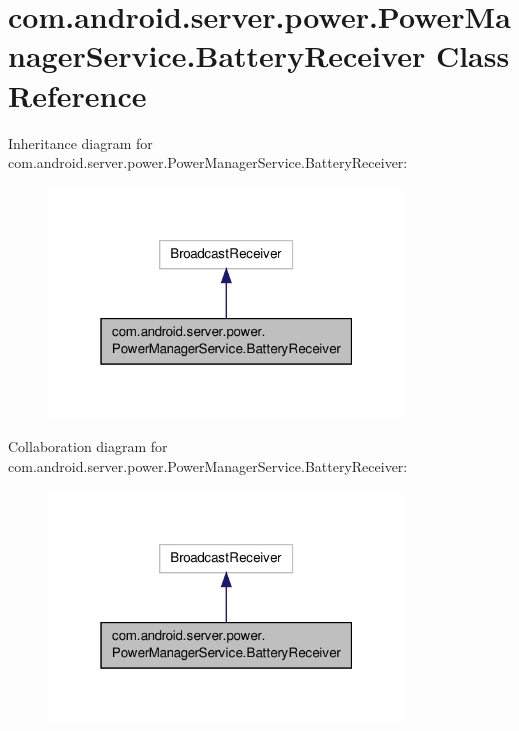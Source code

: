 \hypertarget{classcom_1_1android_1_1server_1_1power_1_1PowerManagerService_1_1BatteryReceiver}{\section{com.\-android.\-server.\-power.\-Power\-Manager\-Service.\-Battery\-Receiver Class Reference}
\label{classcom_1_1android_1_1server_1_1power_1_1PowerManagerService_1_1BatteryReceiver}
}


Inheritance diagram for com.\-android.\-server.\-power.\-Power\-Manager\-Service.\-Battery\-Receiver\-:
\nopagebreak
\begin{figure}[H]
\begin{center}
\leavevmode
\includegraphics[width=268pt]{classcom_1_1android_1_1server_1_1power_1_1PowerManagerService_1_1BatteryReceiver__inherit__graph}
\end{center}
\end{figure}


Collaboration diagram for com.\-android.\-server.\-power.\-Power\-Manager\-Service.\-Battery\-Receiver\-:
\nopagebreak
\begin{figure}[H]
\begin{center}
\leavevmode
\includegraphics[width=268pt]{classcom_1_1android_1_1server_1_1power_1_1PowerManagerService_1_1BatteryReceiver__coll__graph}
\end{center}
\end{figure}
